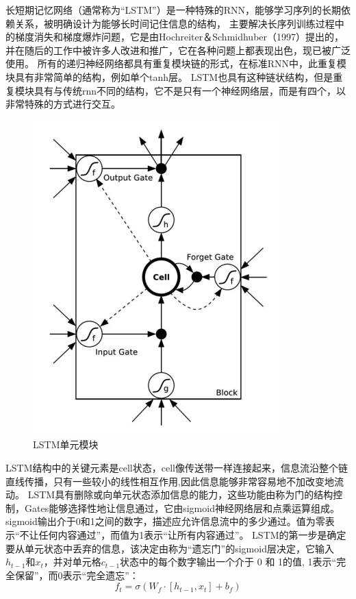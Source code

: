 长短期记忆网络（通常称为“LSTM”）是一种特殊的RNN\cite{hochreiter1997long}，能够学习序列的长期依赖关系，被明确设计为能够长时间记住信息的结构，
主要解决长序列训练过程中的梯度消失和梯度爆炸问题，它是由Hochreiter＆Schmidhuber（1997）提出的，
并在随后的工作中被许多人改进和推广，它在各种问题上都表现出色，现已被广泛使用。
所有的递归神经网络都具有重复模块链的形式，在标准RNN中，此重复模块具有非常简单的结构，例如单个tanh层。
LSTM也具有这种链状结构，但是重复模块具有与传统rnn不同的结构，它不是只有一个神经网络层，而是有四个，以非常特殊的方式进行交互。

\begin{figure}[htbp]
  \centering
  \includegraphics[scale=0.5]{./images/LSTM.jpg}
  \caption{LSTM单元模块\cite{sundermeyer2012lstm}}
  \label{fig:LSTM}
\end{figure}

LSTM结构中的关键元素是cell状态\cite{zhang2016highway}，cell像传送带一样连接起来，信息流沿整个链直线传播，只有一些较小的线性相互作用,因此信息能够非常容易地不加改变地流动。
LSTM具有删除或向单元状态添加信息的能力，这些功能由称为门的结构控制，Gates能够选择性地让信息通过，它由sigmoid神经网络层和点乘运算组成。
sigmoid输出介于0和1之间的数字，描述应允许信息流中的多少通过。值为零表示“不让任何内容通过”，而值为1表示“让所有内容通过”。
LSTM的第一步是确定要从单元状态中丢弃的信息，该决定由称为“遗忘门”的sigmoid层决定，它输入$h_{t-1}$和$x_{t}$，并对单元格$c_{t-1}$状态中的每个数字输出一个介于 0 和 1的值,
1表示“完全保留”，而0表示“完全遗忘”：
\begin{equation}
  f_{t}=σ(W_{f}\cdot[h_{t-1},x_t]+b_{f})
  \end{equation}

